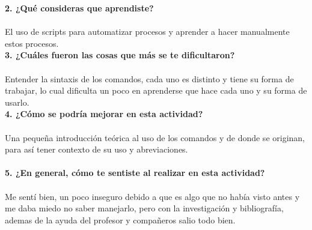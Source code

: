 \documentclass[12pt]{article}
\begin{document}
\noindent\textbf {2. ¿Qué consideras que aprendiste?}\\ \\
El uso de scripts para automatizar procesos y aprender a hacer manualmente estos procesos. \\ 

\noindent\textbf {3. ¿Cuáles fueron las cosas que más se te dificultaron? } \\ \\
Entender la sintaxis de los comandos, cada uno es distinto y tiene  su forma de trabajar, lo cual dificulta un poco en aprenderse que hace cada uno y su forma de usarlo. \\

\noindent\textbf {4. ¿Cómo se podría mejorar en esta actividad?} \\ \\
Una pequeña introducción teórica al uso de los comandos y de donde se originan, para así tener contexto de su uso y abreviaciones. \\ \\

\noindent\textbf {5. ¿En general, cómo te sentiste al realizar en esta actividad? }\\  \\
Me sentí bien, un poco inseguro debido a que es algo que no había visto antes y me daba miedo no saber manejarlo, pero con la investigación y bibliografía, ademas de la ayuda del profesor y compañeros salio todo bien.
\end{document}
